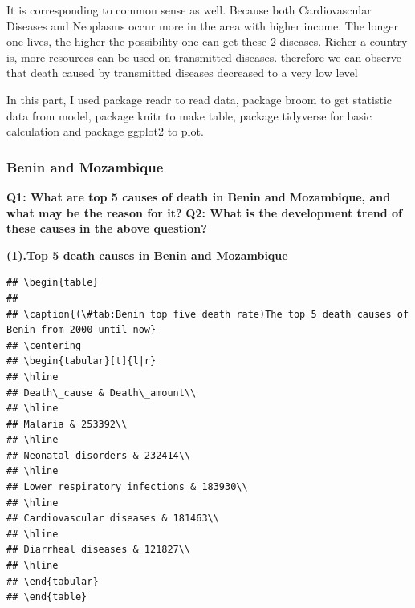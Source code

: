 \documentclass[11pt,a4paper,]{article}
\begin{document}
It is corresponding to common sense as well. Because both Cardiovascular Diseases and Neoplasms occur more in the area with higher income. The longer one lives, the higher the possibility one can get these 2 diseases. Richer a country is, more resources can be used on transmitted diseases. therefore we can observe that death caused by transmitted diseases decreased to a very low level

In this part, I used package readr \textcite{readr} to read data, package broom \textcite{broom} to get statistic data from model, package knitr \textcite{knitr} to make table, package tidyverse \textcite{tidyverse} for basic calculation and package ggplot2 \textcite{ggplot2} to plot.

\clearpage

\hypertarget{benin-and-mozambique}{%
\subsubsection{Benin and Mozambique}\label{benin-and-mozambique}}

\textbf{Q1: What are top 5 causes of death in Benin and Mozambique, and what may be the reason for it?}
\textbf{Q2: What is the development trend of these causes in the above question?}

\textbf{(1).Top 5 death causes in Benin and Mozambique}

\begin{verbatim}
## \begin{table}
## 
## \caption{(\#tab:Benin top five death rate)The top 5 death causes of Benin from 2000 until now}
## \centering
## \begin{tabular}[t]{l|r}
## \hline
## Death\_cause & Death\_amount\\
## \hline
## Malaria & 253392\\
## \hline
## Neonatal disorders & 232414\\
## \hline
## Lower respiratory infections & 183930\\
## \hline
## Cardiovascular diseases & 181463\\
## \hline
## Diarrheal diseases & 121827\\
## \hline
## \end{tabular}
## \end{table}
\end{verbatim}
\end{document}
